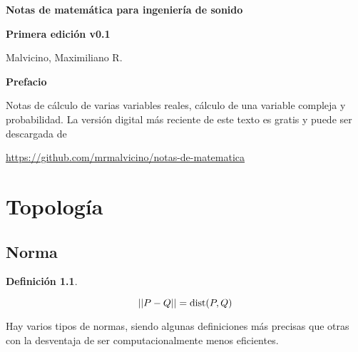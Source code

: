 \documentclass[a5paper,12pt,twoside]{book}
\newtheorem{defn}{{Definición}}[chapter]
\begin{document}
\pagestyle{fancy}
\fancyhf{}
\chead{\scriptsize \nouppercase\rightmark}
\cfoot{\scriptsize \thepage}
\renewcommand{\headrulewidth}{0pt}

\frontmatter
%

\begin{center}

    \begin{Huge}
    \textbf{Notas de matemática para ingeniería de sonido}
    \end{Huge}

    \vspace{1cm}
    \textbf{Primera edición v0.1}
    \vspace{2cm}

    \begin{Large}
        Malvicino, Maximiliano R.
    \end{Large}

\end{center}

\clearpage
\noindent
\textbf{Prefacio}

Notas de cálculo de varias variables reales, cálculo de una variable compleja y probabilidad.
La versión digital más reciente de este texto es gratis y puede ser descargada de
\begin{center}
    \small
    \url{https://github.com/mrmalvicino/notas-de-matematica}
\end{center}

\renewcommand{\spanishappendixname}{Anexo}
\tableofcontents

\mainmatter
{}


\chapter{Topología}


\section{Norma}

\begin{mdframed}[style=MyFrame1]
    \begin{defn}
    \end{defn}
    \begin{equation*}
        {\left|\left| {P-Q} \right|\right|} = \operatorname{dist} (P,Q)
    \end{equation*}
\end{mdframed}

Hay varios tipos de normas, siendo algunas definiciones más precisas que otras con la desventaja de ser computacionalmente menos eficientes.
\end{document}

